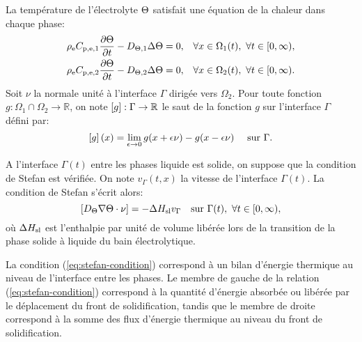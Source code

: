 La température de l'électrolyte $\Theta$ satisfait une équation
de la chaleur dans chaque phase:
\begin{align}
  &\rho_\mathrm{e}C_{\mathrm{p,e,1}} \frac{\partial
    \Theta}{\partial t} - D_{\Theta,\mathrm{1}} \Delta\Theta
  = 0, & \forall x \in \Omega_1(t),\ \forall t\in [0,\infty),\label{eq:heat-solid-phase}\\
    &\rho_\mathrm{e}C_{\mathrm{p,e,2}} \frac{\partial
    \Theta}{\partial t} - D_{\Theta,\mathrm{2}} \Delta\Theta
  = 0, & \forall x \in \Omega_2(t),\ \forall t\in [0,\infty).\label{eq:heat-liquid-phase}
\end{align}
Soit $\nu$ la normale unité à l'interface $\Gamma$ dirigée vers
$\Omega_2$. Pour toute fonction $g:\Omega_1\cap\Omega_2\to\mathbb R$,
on note $\left[ g \right]:\Gamma\to\mathbb R$ le saut de la fonction $g$ sur
l'interface $\Gamma$ défini par:
\begin{equation}
  \left[ g \right](x) = \lim_{\epsilon\to 0}g(x + \epsilon\nu) - g(x -
  \epsilon\nu) \quad \text{ sur } \Gamma.
\end{equation}

A l'interface $\Gamma(t)$ entre les phases liquide est solide, on suppose que
la condition de Stefan est vérifiée. On note $v_\Gamma(t, x)$ la vitesse
de l'interface $\Gamma(t)$. La condition de Stefan s'écrit alors:
\begin{equation}
  \jump{\electrolytetdiff\nabla\temperature \cdot \nu} %
  = - \fusionenthalpy v_\Gamma\quad\text{sur }\Gamma(t),\ \forall t\in[0,\infty),
  \label{eq:stefan-condition}
\end{equation}
où $\Delta H_\mathrm{sl}$ est l'enthalpie par unité de volume
libérée lors de la transition de la phase solide à liquide du
bain électrolytique.

La condition (\ref{eq:stefan-condition}) correspond à un bilan
d'énergie thermique au niveau de l'interface entre les phases. Le
membre de gauche de la relation (\ref{eq:stefan-condition}) correspond
à la quantité d'énergie absorbée ou libérée par le déplacement du
front de solidification, tandis que le membre de droite correspond à
la somme des flux d'énergie thermique au niveau du front de
solidification.

